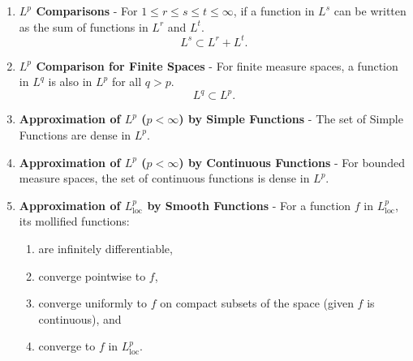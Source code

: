 \documentclass{article}
\begin{document}
\begin{enumerate}
        \item \textbf{$L^p$ Comparisons} - For $1 \leq r \leq s \leq t \leq \infty$, if a function in $L^s$ can be written as the sum of functions in $L^r$ and $L^t$.  $$L^s \subset L^r + L^t.$$
        \item \textbf{$L^p$ Comparison for Finite Spaces} - For finite measure spaces, a function in $L^q$ is also in $L^p$ for all $q > p$.  $$L^q \subset L^p.$$
        \item \textbf{Approximation of $L^p$ ($p<\infty$) by Simple Functions} - The set of Simple Functions are dense in $L^p$.
        \item \textbf{Approximation of $L^p$ ($p<\infty$) by Continuous Functions} - For bounded measure spaces, the set of continuous functions is dense in $L^p$.
        \item \textbf{Approximation of $L^p_{\text{loc}}$ by Smooth Functions} - For a function $f$ in $L^p_{\text{loc}}$, its mollified functions:
        \begin{enumerate}
            \item are infinitely differentiable,
            \item converge pointwise to $f$,
            \item converge uniformly to $f$ on compact subsets of the space (given $f$ is continuous), and
            \item converge to $f$ in $L^p_{\text{loc}}$.
        \end{enumerate}
    \end{enumerate}
\end{document}
